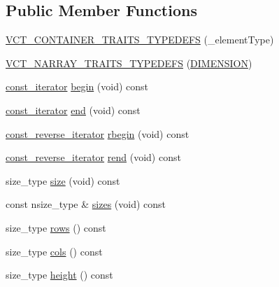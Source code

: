 \subsection*{Public Member Functions}
\begin{DoxyCompactItemize}
\item 
\hyperlink{classvct_dynamic_const_matrix_base_a38e38a492db800c1e9dd024b6f09bb26}{V\+C\+T\+\_\+\+C\+O\+N\+T\+A\+I\+N\+E\+R\+\_\+\+T\+R\+A\+I\+T\+S\+\_\+\+T\+Y\+P\+E\+D\+E\+F\+S} (\+\_\+element\+Type)
\item 
\hyperlink{classvct_dynamic_const_matrix_base_a15bb36089d494e711dd5ebef48523c13}{V\+C\+T\+\_\+\+N\+A\+R\+R\+A\+Y\+\_\+\+T\+R\+A\+I\+T\+S\+\_\+\+T\+Y\+P\+E\+D\+E\+F\+S} (\hyperlink{classvct_dynamic_const_matrix_base_ad4b10a99ce01d58a9d7049bf0f28ee95a7101e5e87be1df37bf896f120fa37d10}{D\+I\+M\+E\+N\+S\+I\+O\+N})
\item 
\hyperlink{classvct_dynamic_const_matrix_base_a665b16a8ecd8b6febb4d193efa42205e}{const\+\_\+iterator} \hyperlink{classvct_dynamic_const_matrix_base_a2b9396d713323d6be33a74c62e73a595}{begin} (void) const 
\item 
\hyperlink{classvct_dynamic_const_matrix_base_a665b16a8ecd8b6febb4d193efa42205e}{const\+\_\+iterator} \hyperlink{classvct_dynamic_const_matrix_base_a40241b13b0e08011e7a7e1a7afb8c91e}{end} (void) const 
\item 
\hyperlink{classvct_dynamic_const_matrix_base_afc30420e745eed5f1c838a01088ddc84}{const\+\_\+reverse\+\_\+iterator} \hyperlink{classvct_dynamic_const_matrix_base_aa549e76e67cf028a4cc2c931b22e7f7d}{rbegin} (void) const 
\item 
\hyperlink{classvct_dynamic_const_matrix_base_afc30420e745eed5f1c838a01088ddc84}{const\+\_\+reverse\+\_\+iterator} \hyperlink{classvct_dynamic_const_matrix_base_a354a18f7aa79151af16791038e02eb3e}{rend} (void) const 
\item 
size\+\_\+type \hyperlink{classvct_dynamic_const_matrix_base_ab9d484f83471aee6512ea614aa54bd0b}{size} (void) const 
\item 
const nsize\+\_\+type \& \hyperlink{classvct_dynamic_const_matrix_base_ab8946f5d9d05321fcadf07f65dc314ce}{sizes} (void) const 
\item 
size\+\_\+type \hyperlink{classvct_dynamic_const_matrix_base_a5eac13be2207ebeb8766cde379d73438}{rows} () const 
\item 
size\+\_\+type \hyperlink{classvct_dynamic_const_matrix_base_aa6c51d41a100da49a7e7ac7edb20ecd9}{cols} () const 
\item 
size\+\_\+type \hyperlink{classvct_dynamic_const_matrix_base_adbd3993425c2d68113e1bc0848bee850}{height} () const 

\end{DoxyCompactItemize}
